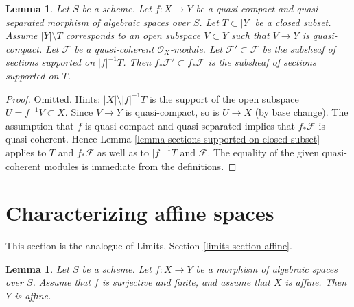 \documentclass{stacks-project}
\theoremstyle{plain}
\newtheorem{lemma}[subsection]{Lemma}
\theoremstyle{definition}
\theoremstyle{remark}
\numberwithin{equation}{subsection}
\begin{document}
\begin{lemma}
\label{lemma-push-sections-supported-on-closed-subset}
Let $S$ be a scheme.
Let $f : X \to Y$ be a quasi-compact and quasi-separated morphism
of algebraic spaces over $S$. Let $T \subset |Y|$ be a closed subset.
Assume $|Y| \setminus T$ corresponds to an open subspace $V \subset Y$
such that $V \to Y$ is quasi-compact. Let $\mathcal{F}$ be a quasi-coherent
$\mathcal{O}_X$-module. Let $\mathcal{F}' \subset \mathcal{F}$
be the subsheaf of sections supported on $|f|^{-1}T$.
Then $f_*\mathcal{F}' \subset f_*\mathcal{F}$ is the subsheaf
of sections supported on $T$.
\end{lemma}

\begin{proof}
Omitted. Hints: $|X| \setminus |f|^{-1}T$ is the support of the open subspace
$U = f^{-1}V \subset X$. Since $V \to Y$ is quasi-compact, so is
$U \to X$ (by base change). The assumption that $f$ is quasi-compact and
quasi-separated implies that $f_*\mathcal{F}$ is quasi-coherent.
Hence Lemma \ref{lemma-sections-supported-on-closed-subset}
applies to $T$ and $f_*\mathcal{F}$ as well as to
$|f|^{-1}T$ and $\mathcal{F}$. The equality of the given quasi-coherent
modules is immediate from the definitions.
\end{proof}















\section{Characterizing affine spaces}
\label{section-affine}

\noindent
This section is the analogue of Limits, Section \ref{limits-section-affine}.

\begin{lemma}
\label{lemma-affine}
Let $S$ be a scheme. Let $f : X \to Y$ be a morphism of algebraic spaces
over $S$. Assume that $f$ is surjective and finite, and assume that $X$
is affine. Then $Y$ is affine.
\end{lemma}
\end{document}
